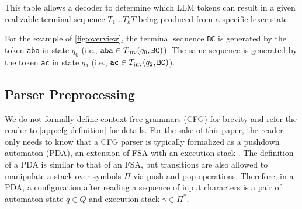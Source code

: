 This table allows a decoder to determine which LLM tokens can result in a given realizable terminal sequence $T_1 \ldots T_k T$ being produced from a specific lexer state.

For the example of \autoref{fig:overview}, the terminal sequence \texttt{BC} is generated by the token \texttt{aba} in state $q_0$ (i.e., $\texttt{aba} \in T_{\textrm{inv}}(q_0, \texttt{BC})$). The same sequence is generated by the token \texttt{ac} in state $q_2$ (i.e., $\texttt{ac} \in T_{\textrm{inv}}(q_2, \texttt{BC})$).





\subsection{Parser Preprocessing}
\label{sec:parsing}

We do not formally define context-free grammars (CFG) for brevity and refer the reader to \autoref{app:cfg-definition} for details.
% 
For the sake of this paper, the reader only needs to know that a CFG parser is typically formalized as a pushdown automaton (PDA), an extension of FSA with an execution stack \cite{schutzenberger1963context}.
The definition of a PDA is similar to that of an FSA, but transitions are also allowed to manipulate a stack over symbols $\Pi$ via push and pop operations.
Therefore, in a PDA, a configuration after reading a sequence of input characters is a pair of automaton state $q\in Q$ and execution stack $\gamma\in \Pi^\ast$.
 
